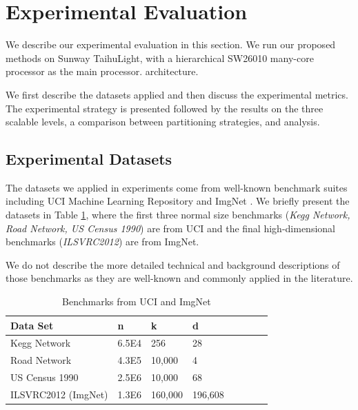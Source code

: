 \documentclass[10pt,journal,compsoc]{IEEEtran}
\begin{document}

\section{Experimental Evaluation}
We describe our experimental evaluation in this section. We run our proposed methods on Sunway TaihuLight, with a hierarchical SW26010 many-core processor as the main processor. architecture. 

We first describe the datasets applied and then discuss the experimental metrics. The experimental strategy is presented followed by the results on the three scalable levels, a comparison between partitioning strategies, and analysis. 


\subsection{Experimental Datasets}
The datasets we applied in experiments come from well-known benchmark suites including UCI Machine Learning Repository\cite{uci} and ImgNet \cite{imgnet}. We briefly present the datasets in Table \ref{t1}, where the first three normal size benchmarks ({\it Kegg Network, Road Network, US Census 1990}) are from UCI and the final high-dimensional benchmarks ({\it ILSVRC2012}) are from ImgNet.

We do not describe the more detailed technical and background descriptions of those benchmarks as they are well-known and commonly applied in the literature. 

\begin{table}
  \caption{Benchmarks from UCI and ImgNet}
  \label{t1}
   \begin{tabular}{p{2.5cm} p{1.5cm} p{1.5cm}p{1.5cm} c c c c}
      \hline
    Data Set &n & k & d\\
       \hline
    Kegg Network &6.5E4 &256 &28  \\
    Road Network &4.3E5 &10,000 &4 \\
    US Census 1990 &2.5E6 &10,000 &68 \\
    \hline
    ILSVRC2012 (ImgNet) &1.3E6 &160,000 &196,608 \\
    \hline
  \end{tabular}
\end{table}
\end{document}
